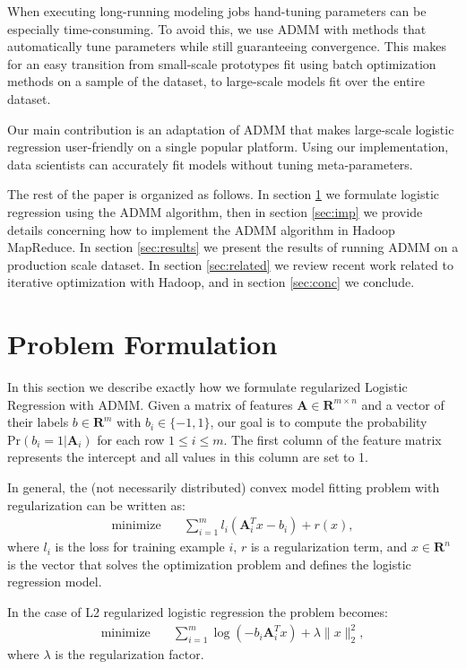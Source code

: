 \documentclass[10pt, conference, compsocconf]{IEEEtran}
\begin{document}
When executing long-running modeling jobs hand-tuning parameters can be especially time-consuming.  To avoid this, we use ADMM with methods that automatically tune parameters while still guaranteeing convergence.  This makes for an easy transition from small-scale prototypes fit using batch optimization methods on a sample of the dataset, to large-scale models fit over the entire dataset.

Our main contribution is an adaptation of ADMM that makes large-scale logistic regression user-friendly on a single popular platform.  Using our implementation, data scientists can accurately fit models without tuning meta-parameters.

The rest of the paper is organized as follows.  In section \ref{sec:prob} we formulate logistic regression using the ADMM algorithm, then in section \ref{sec:imp} we provide details concerning how to implement the ADMM algorithm in Hadoop MapReduce.  In section \ref{sec:results} we present the results of running ADMM on a production scale dataset.  In section \ref{sec:related} we review recent work related to iterative optimization with Hadoop, and in section \ref{sec:conc} we conclude.

\section{Problem Formulation}\label{sec:prob}

In this section we describe exactly how we formulate regularized Logistic Regression with ADMM. Given a matrix of features $\mathbf{A}\in\mathbf{R}^{m\times n}$ and a vector of their labels $b\in\mathbf{R}^m$ with $b_i\in\{-1,1\}$, our goal is to compute the probability $\text{Pr}(b_i=1|\mathbf{A}_i)$ for each row $1\leq i\leq m$.  The first column of the feature matrix represents the intercept and all values in this column are set to 1.

In general, the (not necessarily distributed) convex model fitting problem with regularization can be written as:
\begin{align*}
\text{minimize}&\quad \sum_{i=1}^m l_i(\mathbf{A}_i^Tx - b_i) + r(x),
\end{align*}
where $l_i$ is the loss for training example $i$, $r$ is a regularization term, and $x\in\mathbf{R}^n$ is the vector that solves the optimization problem and defines the logistic regression model.

In the case of L2 regularized logistic regression the problem becomes:
\begin{align*}
\text{minimize}&\quad \sum_{i=1}^m \log(-b_i\mathbf{A}_i^Tx) + \lambda\|x\|_2^2,
\end{align*}
where $\lambda$ is the regularization factor.
\end{document}
